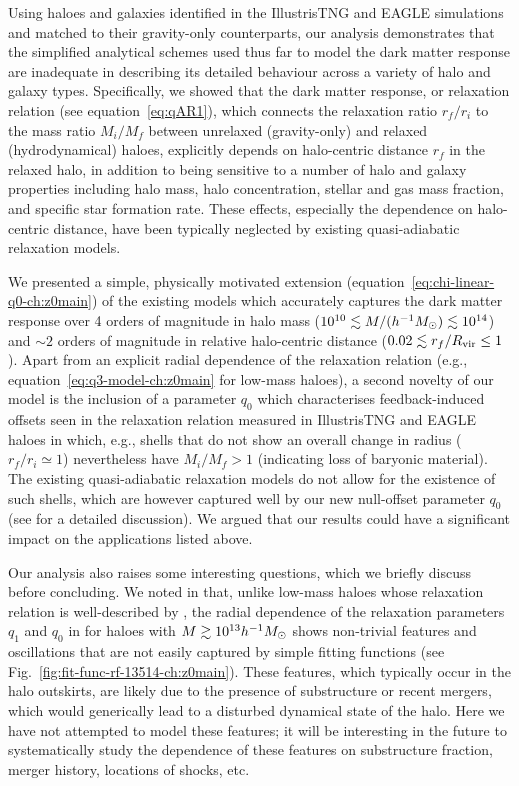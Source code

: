 Using haloes and galaxies identified in the IllustrisTNG and EAGLE simulations and matched to their gravity-only counterparts, our analysis demonstrates that the simplified analytical schemes used thus far to model the dark matter response \citep[e.g.,][]{1986ApJ...301...27B,2010MNRAS.407..435A,2015JCAP...12..049S} are inadequate in describing its detailed behaviour across a variety of halo and galaxy types. Specifically, we showed that the dark matter response, or relaxation relation (see equation~\ref{eq:qAR1}), which connects the relaxation ratio $r_f/r_i$ to the mass ratio $M_i/M_f$ between unrelaxed (gravity-only) and relaxed (hydrodynamical) haloes, explicitly depends on halo-centric distance $r_f$ in the relaxed halo, in addition to being sensitive to a number of halo and galaxy properties including halo mass, halo concentration, stellar and gas mass fraction, and specific star formation rate. These effects, especially the dependence on halo-centric distance, have been typically neglected by existing quasi-adiabatic relaxation models. 

We presented a simple, physically motivated extension (equation~\ref{eq:chi-linear-q0-ch:z0main}) of the existing models which accurately captures the dark matter response over 4 orders of magnitude in halo mass ($10^{10}\lesssim M/(h^{-1}M_{\odot})\lesssim 10^{14}$) and $\sim2$ orders of magnitude in relative halo-centric distance ($0.02\lesssim r_f/R_{\rm vir}\leq1$). Apart from an explicit radial dependence of the relaxation relation (e.g., equation~\ref{eq:q3-model-ch:z0main} for low-mass haloes), a second novelty of our model is the inclusion of a parameter $q_0$ which characterises feedback-induced offsets seen in the relaxation relation measured in IllustrisTNG and EAGLE haloes in which, e.g., shells that do not show an overall change in radius ($r_f/r_i\simeq1$) nevertheless have $M_i/M_f>1$ (indicating loss of baryonic material). The existing quasi-adiabatic relaxation models do not allow for the existence of such shells, which are however captured well by our new null-offset parameter $q_0$ (see  for a detailed discussion).
We argued that our results could have a significant impact on the applications listed above.

Our analysis also raises some interesting questions, which we briefly discuss before concluding. We noted in  that, unlike low-mass haloes whose relaxation relation is well-described by , the radial dependence of the relaxation parameters $q_1$ and $q_0$ in  for haloes with $M\gtrsim10^{13}h^{-1}M_{\odot}$ shows non-trivial features and oscillations that are not easily captured by simple fitting functions (see Fig.~\ref{fig:fit-func-rf-13514-ch:z0main}). These features, which typically occur in the halo outskirts, are likely due to the presence of substructure or recent mergers, which would generically lead to a disturbed dynamical state of the halo. Here we have not attempted to model these features; it will be interesting in the future to systematically study the dependence of these features on substructure fraction, merger history, locations of shocks, etc.

